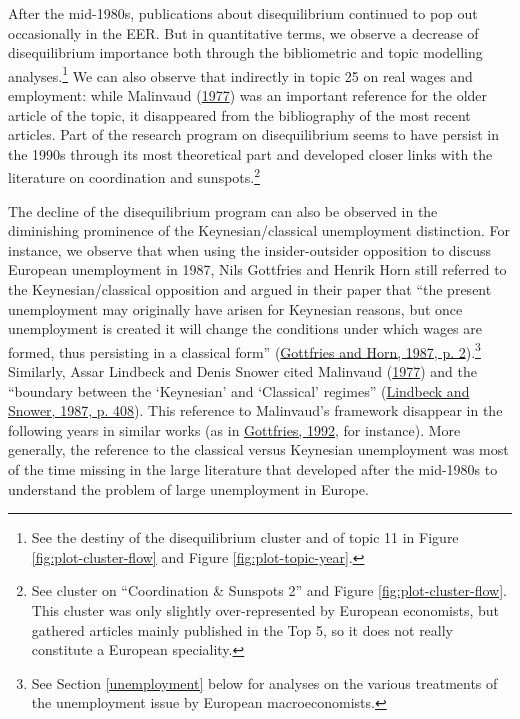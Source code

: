 \documentclass[
  12pt,
  onecolumn]{article}
\begin{document}
After the mid-1980s, publications about disequilibrium continued to pop
out occasionally in the EER. But in quantitative terms, we observe a
decrease of disequilibrium importance both through the bibliometric and
topic modelling analyses.\footnote{See the destiny of the disequilibrium
  cluster and of topic 11 in Figure \ref{fig:plot-cluster-flow} and
  Figure \ref{fig:plot-topic-year}.} We can also observe that indirectly
in topic 25 on real wages and employment: while Malinvaud
(\protect\hyperlink{ref-malinvaud1977}{1977}) was an important reference
for the older article of the topic, it disappeared from the bibliography
of the most recent articles. Part of the research program on
disequilibrium seems to have persist in the 1990s through its most
theoretical part and developed closer links with the literature on
coordination and sunspots.\footnote{See cluster on ``Coordination \&
  Sunspots 2'' and Figure \ref{fig:plot-cluster-flow}. This cluster was
  only slightly over-represented by European economists, but gathered
  articles mainly published in the Top 5, so it does not really
  constitute a European speciality.}

The decline of the disequilibrium program can also be observed in the
diminishing prominence of the Keynesian/classical unemployment
distinction. For instance, we observe that when using the
insider-outsider opposition to discuss European unemployment in 1987,
Nils Gottfries and Henrik Horn still referred to the Keynesian/classical
opposition and argued in their paper that ``the present unemployment may
originally have arisen for Keynesian reasons, but once unemployment is
created it will change the conditions under which wages are formed, thus
persisting in a classical form''
(\protect\hyperlink{ref-gottfries1987}{Gottfries and Horn, 1987, p.
2}).\footnote{See Section \ref{unemployment} below for analyses on the
  various treatments of the unemployment issue by European
  macroeconomists.} Similarly, Assar Lindbeck and Denis Snower cited
Malinvaud (\protect\hyperlink{ref-malinvaud1977}{1977}) and the
``boundary between the `Keynesian' and `Classical' regimes''
(\protect\hyperlink{ref-lindbeck1987a}{Lindbeck and Snower, 1987, p.
408}). This reference to Malinvaud's framework disappear in the
following years in similar works (as in
\protect\hyperlink{ref-gottfries1992}{Gottfries, 1992}, for instance).
More generally, the reference to the classical versus Keynesian
unemployment was most of the time missing in the large literature that
developed after the mid-1980s to understand the problem of large
unemployment in Europe.
\end{document}
